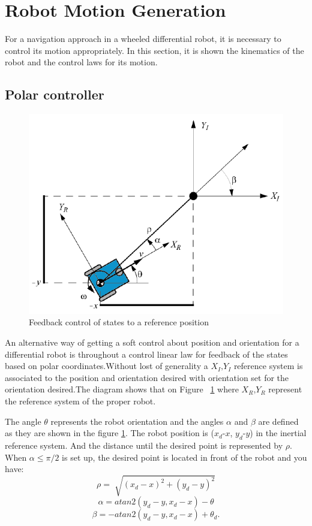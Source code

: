 \documentclass[conference]{IEEEtran}
\begin{document}
\section{Robot Motion Generation}
\label{sec:robot_motion}
For a navigation approach in a wheeled differential robot, it is necessary to control its motion appropriately. In this section, it is shown the kinematics of the robot and the control laws for its motion.

\subsection{Polar controller}

\begin{figure}[h]
  \includegraphics[width=0.5\linewidth]{control_polar.png}
  \centering\caption{Feedback control of states to a reference position}
  \label{fig:Polar}
\end{figure}

An alternative way of getting a soft control about position and orientation for a differential robot is throughout a control linear law for feedback  of the states based on polar coordinates.Without lost of generality a $\textbf{$X_{I}$,$Y_{I}$}$ reference system is associated to the position and orientation desired with orientation  set for the orientation desired.The diagram shows that on Figure ~\ref{fig:Polar} where $\textbf{$X_{R}$,$Y_{R}$}$ represent the reference system of the proper robot.

The angle $\theta$ represents the robot orientation and the angles $\alpha$ and $\beta$ are defined as they are shown in the figure \ref{fig:Polar}. The robot position is ($x_{d}$-$x$, $y_{d}$-$y$) in the inertial reference system. And the distance until the desired point is represented by $\rho$. When $\alpha \leq \pi/2 $ is set up, the desired point is located in front of the robot and you have:
\begin{equation}
	\rho = \sqrt[]{(x_{d} - x)^2 + (y_{d} - y)^2} 
\end{equation}
\begin{equation}
	\alpha = atan2(y_{d} - y, x_{d} - x) - \theta 
\end{equation}
\begin{equation}
	\beta = -atan2(y_{d} - y, x_{d} - x) + \theta_{d}.
\end{equation}
\end{document}
